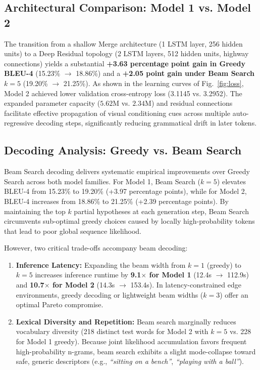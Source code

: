 \documentclass[10pt,conference,a4paper]{IEEEtran}
\begin{document}
\subsection{Architectural Comparison: Model 1 vs. Model 2}
The transition from a shallow Merge architecture (1 LSTM layer, 256 hidden units) to a Deep Residual topology (2 LSTM layers, 512 hidden units, highway connections) yields a substantial \textbf{+3.63 percentage point gain in Greedy BLEU-4} (15.23\% $\to$ 18.86\%) and a \textbf{+2.05 point gain under Beam Search $k=5$} (19.20\% $\to$ 21.25\%). As shown in the learning curves of Fig.~\ref{fig:loss}, Model 2 achieved lower validation cross-entropy loss (3.1145 vs. 3.2952). The expanded parameter capacity ($5.62\text{M}$ vs. $2.34\text{M}$) and residual connections facilitate effective propagation of visual conditioning cues across multiple auto-regressive decoding steps, significantly reducing grammatical drift in later tokens.

\subsection{Decoding Analysis: Greedy vs. Beam Search}
Beam Search decoding delivers systematic empirical improvements over Greedy Search across both model families. For Model 1, Beam Search ($k=5$) elevates BLEU-4 from 15.23\% to 19.20\% (+3.97 percentage points), while for Model 2, BLEU-4 increases from 18.86\% to 21.25\% (+2.39 percentage points). By maintaining the top $k$ partial hypotheses at each generation step, Beam Search circumvents sub-optimal greedy choices caused by locally high-probability tokens that lead to poor global sequence likelihood. 

However, two critical trade-offs accompany beam decoding:
\begin{enumerate}
    \item \textbf{Inference Latency:} Expanding the beam width from $k=1$ (greedy) to $k=5$ increases inference runtime by \textbf{9.1$\times$ for Model 1} (12.4s $\to$ 112.9s) and \textbf{10.7$\times$ for Model 2} (14.3s $\to$ 153.4s). In latency-constrained edge environments, greedy decoding or lightweight beam widths ($k=3$) offer an optimal Pareto compromise.
    \item \textbf{Lexical Diversity and Repetition:} Beam search marginally reduces vocabulary diversity (218 distinct test words for Model 2 with $k=5$ vs. 228 for Model 1 greedy). Because joint likelihood accumulation favors frequent high-probability n-grams, beam search exhibits a slight mode-collapse toward safe, generic descriptors (e.g., \textit{``sitting on a bench''}, \textit{``playing with a ball''}).
\end{enumerate}
\end{document}
